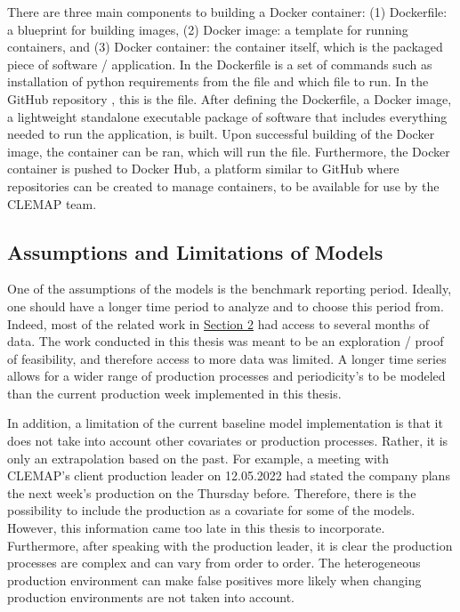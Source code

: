 There are three main components to building a Docker container: (1) Dockerfile: a blueprint for building images, (2) Docker image: a template for running containers, and (3) Docker container: the container itself, which is the packaged piece of software / application. In the Dockerfile is a set of commands such as installation of python requirements from the  file and which file to run. In the GitHub repository \cite{Stechschulte_Gaussian_Processes_for_2022}, this is the  file. After defining the Dockerfile, a Docker image, a lightweight standalone executable package of software that includes everything needed to run the application, is built. Upon successful building of the Docker image, the container can be ran, which will run the  file. Furthermore, the Docker container is pushed to Docker Hub, a platform similar to GitHub where repositories can be created to manage containers, to be available for use by the CLEMAP team. 

\subsection{Assumptions and Limitations of Models}

One of the assumptions of the models is the benchmark reporting period. Ideally, one should have a longer time period to analyze and to choose this period from. Indeed, most of the related work in \hyperlink{section.2}{Section 2} had access to several months of data. The work conducted in this thesis was meant to be an exploration / proof of feasibility, and therefore access to more data was limited. A longer time series allows for a wider range of production processes and periodicity's to be modeled than the current production week implemented in this thesis.

In addition, a limitation of the current baseline model implementation is that it does not take into account other covariates or production processes. Rather, it is only an extrapolation based on the past. For example, a meeting with CLEMAP's client production leader on 12.05.2022 had stated the company plans the next week's production on the Thursday before. Therefore, there is the possibility to include the production as a covariate for some of the models. However, this information came too late in this thesis to incorporate. Furthermore, after speaking with the production leader, it is clear the production processes are complex and can vary from order to order. The heterogeneous production environment can make false positives more likely when changing production environments are not taken into account.